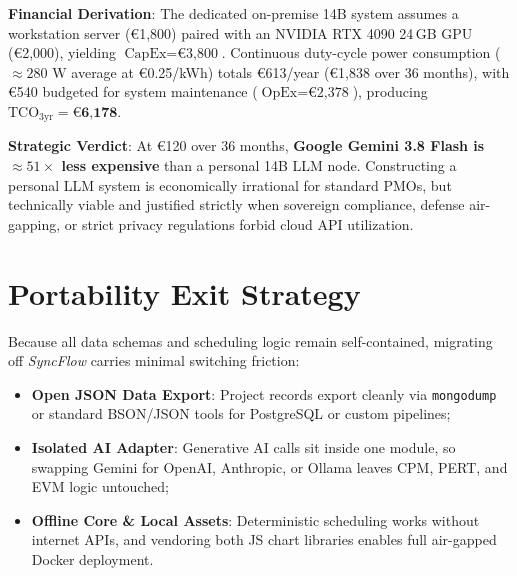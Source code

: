 \noindent \textbf{Financial Derivation}: The dedicated on-premise 14B system assumes a workstation server (€1,800) paired with an NVIDIA RTX 4090 24\,GB GPU (€2,000), yielding $\text{CapEx} = \text{€3,800}$. Continuous duty-cycle power consumption ($\approx 280\text{ W}$ average at €0.25/kWh) totals €613/year (€1,838 over 36 months), with €540 budgeted for system maintenance ($\text{OpEx} = \text{€2,378}$), producing $\text{TCO}_{\text{3yr}} = \mathbf{\text{€6,178}}$.

\noindent \textbf{Strategic Verdict}: At €120 over 36 months, \textbf{Google Gemini 3.8 Flash is $\approx 51\times$ less expensive} than a personal 14B LLM node. Constructing a personal LLM system is economically irrational for standard PMOs, but technically viable and justified strictly when sovereign compliance, defense air-gapping, or strict privacy regulations forbid cloud API utilization.

\vspace{4mm}

\section{Portability Exit Strategy}
Because all data schemas and scheduling logic remain self-contained, migrating off \textit{SyncFlow} carries minimal switching friction:
\begin{itemize}[itemsep=1.5pt,topsep=1.5pt]
    \item \textbf{Open JSON Data Export}: Project records export cleanly via \texttt{mongodump} or standard BSON/JSON tools for PostgreSQL or custom pipelines;
    \item \textbf{Isolated AI Adapter}: Generative AI calls sit inside one module, so swapping Gemini for OpenAI, Anthropic, or Ollama leaves CPM, PERT, and EVM logic untouched;
    \item \textbf{Offline Core \& Local Assets}: Deterministic scheduling works without internet APIs, and vendoring both JS chart libraries enables full air-gapped Docker deployment.
\end{itemize}

